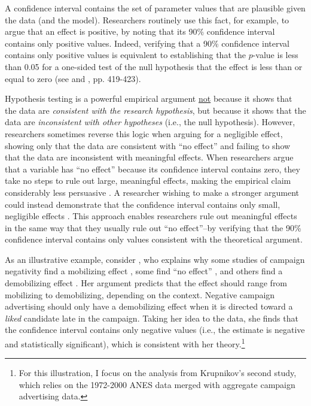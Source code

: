 \documentclass[12pt]{article}
\begin{document}
A confidence interval contains the set of parameter values that are plausible given the data (and the model). Researchers routinely use this fact, for example, to argue that an effect is positive, by noting that its 90\% confidence interval contains only positive values. Indeed, verifying that a 90\% confidence interval contains only positive values is equivalent to establishing that the $p$-value is less than 0.05 for a one-sided test of the null hypothesis that the effect is less than or equal to zero (see \citealt{Achen1982} and \citealt{CasellaBerger2002}, pp. 419-423).

Hypothesis testing is  a powerful empirical argument \uline{not} because it shows that the data are \textit{consistent with the research hypothesis}, but because it shows that the data are \textit{inconsistent with other hypotheses} (i.e., the null hypothesis).
However, researchers sometimes reverse this logic when arguing for a negligible effect, showing only that the data are consistent with ``no effect'' and failing to show that the data are inconsistent with meaningful effects.  When researchers argue that a variable has ``no effect'' because its confidence interval contains zero, they take no steps to rule out large, meaningful effects, making the empirical claim considerably less persuasive \citep{AltmanBland1995, Gill1999, Nickerson2000}. A researcher wishing to make a stronger argument could instead demonstrate that the confidence interval contains only small, negligible effects \citep{Metzler1974, Westlake1972, Westlake1979}. This approach enables researchers rule out meaningful effects in the same way that they usually rule out ``no effect''--by verifying that the 90\% confidence interval contains only values consistent with the theoretical argument.

As an illustrative example, consider \cite{Krupnikov2011}, who explains why some studies of campaign negativity find a mobilizing effect \citep{GoldsteinFreedman2002}, some find ``no effect'' \citep{FinkelGeer1998}, and others find a demobilizing effect \citep{Ansolabehereetal1994}. Her argument predicts that the effect should range from mobilizing to demobilizing, depending on the context. Negative campaign advertising should only have a demobilizing effect when it is directed toward a \textit{liked} candidate late in the campaign. Taking her idea to the data, she finds that the confidence interval contains only negative values (i.e., the estimate is negative and statistically significant), which is consistent with her theory.\footnote{For this illustration, I focus on the analysis from Krupnikov's second study, which relies on the 1972-2000 ANES data merged with aggregate campaign advertising data.}
\end{document}
